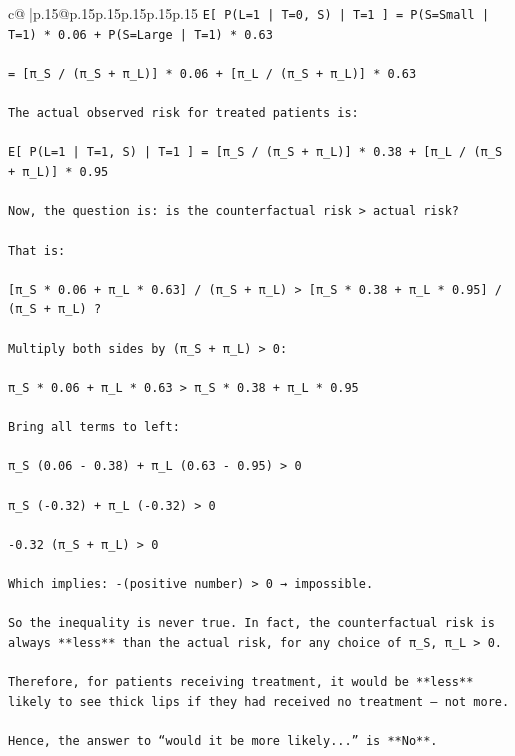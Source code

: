 \documentclass{article}
\begin{document}
{\begin{supertabular}{c@{$\;$}|p{.15\linewidth}@{}p{.15\linewidth}p{.15\linewidth}p{.15\linewidth}p{.15\linewidth}p{.15\linewidth}}
{{{\texttt{E{[} P(L=1 | T=0, S) | T=1 {]} = P(S=Small | T=1) * 0.06 + P(S=Large | T=1) * 0.63} \\
\\ 
\texttt{= {[}π\_S / (π\_S + π\_L){]} * 0.06 + {[}π\_L / (π\_S + π\_L){]} * 0.63} \\
\\ 
\texttt{The actual observed risk for treated patients is:} \\
\\ 
\texttt{E{[} P(L=1 | T=1, S) | T=1 {]} = {[}π\_S / (π\_S + π\_L){]} * 0.38 + {[}π\_L / (π\_S + π\_L){]} * 0.95} \\
\\ 
\texttt{Now, the question is: is the counterfactual risk > actual risk?} \\
\\ 
\texttt{That is:} \\
\\ 
\texttt{{[}π\_S * 0.06 + π\_L * 0.63{]} / (π\_S + π\_L) > {[}π\_S * 0.38 + π\_L * 0.95{]} / (π\_S + π\_L) ?} \\
\\ 
\texttt{Multiply both sides by (π\_S + π\_L) > 0:} \\
\\ 
\texttt{π\_S * 0.06 + π\_L * 0.63 > π\_S * 0.38 + π\_L * 0.95} \\
\\ 
\texttt{Bring all terms to left:} \\
\\ 
\texttt{π\_S (0.06 {-} 0.38) + π\_L (0.63 {-} 0.95) > 0} \\
\\ 
\texttt{π\_S ({-}0.32) + π\_L ({-}0.32) > 0} \\
\\ 
\texttt{{-}0.32 (π\_S + π\_L) > 0} \\
\\ 
\texttt{Which implies: {-}(positive number) > 0 → impossible.} \\
\\ 
\texttt{So the inequality is never true. In fact, the counterfactual risk is always **less** than the actual risk, for any choice of π\_S, π\_L > 0.} \\
\\ 
\texttt{Therefore, for patients receiving treatment, it would be **less** likely to see thick lips if they had received no treatment — not more.} \\
\\ 
\texttt{Hence, the answer to “would it be more likely...” is **No**.} \\
}}}
\end{supertabular}}
\end{document}
